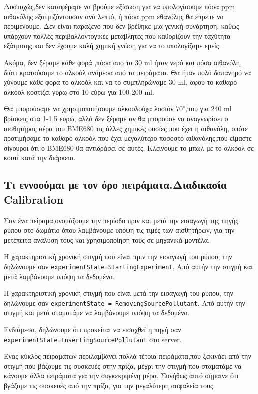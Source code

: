 Δυστυχώς,δεν καταφέραμε να βρούμε εξίσωση για να υπολογίσουμε πόσα ppm αιθανόλης
εξατμιζόντουσαν ανά λεπτό,
ή πόσα ppm εθανόλης θα έπρεπε να περιμένουμε.
Δεν είναι παράξενο που δεν βρέθηκε μια γενική συνάρτηση, καθώς υπάρχουν πολλές
περιβαλλοντογικές μετάβλητες που καθορίζουν την ταχύτητα εξάτμισης και
δεν έχουμε καλή χημική γνώση για να το υπολογίζαμε εμείς.

Ακόμα, δεν ξέραμε κάθε φορά ,πόσα απο τα 30 ml ήταν νερό και πόσα αιθανόλη,
διότι κρατούσαμε το αλκοόλ ανάμεσα από τα πειράματα.
Θα ήταν πολύ δαπανηρό να χύνουμε κάθε φορά το αλκοόλ και να το συμπληρώναμε 30 ml,
αφού το καθαρό αλκόολ κοστίζει γύρω στο 10 εύρω για 100-200 ml.

Θα μπορούσαμε να χρησιμοποιήσουμε αλκοολούχα λοσιόν $70^\circ$,που για 240 ml
βρίσκεις στα 1-1,5 ευρώ,
αλλά δεν ξέραμε αν θα μπορούσε να αναγνωρίσει ο αισθητήρας αέρα του BME680 τις
άλλες χημικές ουσίες που έχει η αιθανόλη,
οπότε προτιμήσαμε το καθαρό αλκοόλ που έχει μεγαλύτερο ποσοστό αιθανόλης,που
είμαστε σίγουροι ότι ο BME680 θα αντιδράσει σε αυτές.
Κλείνουμε το μπωλ με το αλκόολ σε κουτί κατά την διάρκεια.

\subsection{Τι εννοούμαι με τον όρο πειράματα.Διαδικασία Calibration}

Σαν ένα πείραμα,ονομάζουμε την περίοδο πριν και μετά την εισαγωγή της πηγής ρύπου στο
δωμάτιο όπου λαμβάνουμε υπόψη τις τιμές των αισθητήρων, για την μετέπειτα ανάλυση
τους και χρησιμοποίηση τους σε μηχανικά μοντέλα.

Η χαρακτηριστική χρονική στιγμή που είναι πριν την εισαγωγή του ρύπου, την δηλώνουμε
σαν \texttt{experimentState=StartingExperiment}.
Από αυτήν την στιγμή και μετά λαμβάνουμε υπόψη τα δεδομένα.

Η χαρακτηριστική χρονική στιγμή που είναι μετά την εισαγωγή του ρύπου, την δηλώνουμε σαν
\texttt{experimentState = RemovingSourcePollutant}.
Από αυτήν την στιγμή και μετά σταματάμε να λαμβάνουμε υπόψη τα δεδομένα.

Ενδιάμεσα, δηλώνουμε ότι προκείται να εισαχθεί η πηγή σαν \linebreak
\texttt{experimentState=InsertingSourcePollutant} στο server.

Ένας κύκλος πειραμάτων περιλαμβάνει πολλά τέτοια πειράματα,που ξεκινάει από την
στιγμή που βάζουμε τις συσκευές στην πρίζα,
μέχρι την στιγμή που σταματάμε να κάνουμε άλλα πειράματα για την συγκεκριμένη μέρα.
Συνήθως αυτό σήμαινε ότι βγάζαμε τις συσκευές από την πρίζα, για την μεγαλύτερη ασφαλεία
τους.

